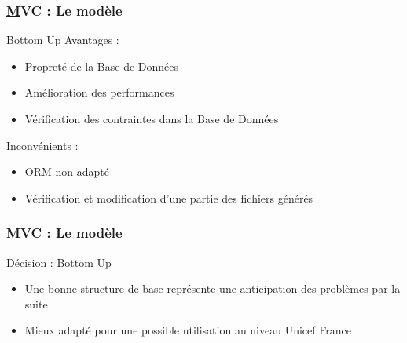 \begin{frame}
	\frametitle{\underline{M}VC : Le modèle}
	\begin{block}{Bottom Up}
	Avantages :
		\begin{itemize}
			\item Propreté de la Base de Données
			\item Amélioration des performances
			\item Vérification des contraintes dans la Base de Données
		\end{itemize} 
	Inconvénients :
		\begin{itemize}
			\item ORM non adapté
			\item Vérification et modification d'une partie des fichiers générés
		\end{itemize}
	\end{block}
  
\end{frame}


\begin{frame}
	\frametitle{\underline{M}VC : Le modèle}
	\begin{block}{Décision : Bottom Up}
		\begin{itemize}
		\item Une bonne structure de base représente une anticipation des problèmes par la suite 
		\item Mieux adapté pour une possible utilisation au niveau Unicef France
		\end{itemize}
		
		
	\end{block}
\end{frame}


